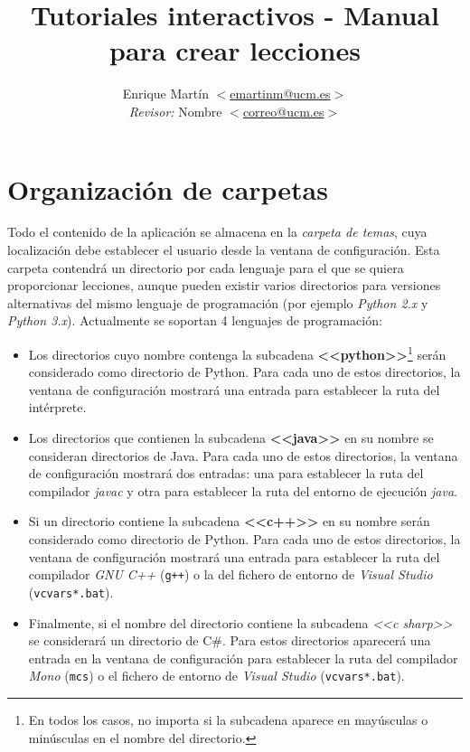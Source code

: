 \documentclass[]{article}
\title{Tutoriales interactivos - Manual para crear lecciones}
\author{Enrique Martín $<$\url{emartinm@ucm.es}$>$ \\ \emph{Revisor:} Nombre $<$\url{correo@ucm.es}$>$\\}
\newcommand{\code}[1]{{\lstinline[basicstyle=\sffamily,mathescape]!#1!}}
\begin{document}
\maketitle

\section{Organización de carpetas}
Todo el contenido de la aplicación se almacena en la \emph{carpeta de temas}, cuya localización debe establecer el usuario desde la ventana de configuración. Esta carpeta contendrá un directorio por cada lenguaje para el que se quiera proporcionar lecciones, aunque pueden existir varios directorios para versiones alternativas del mismo lenguaje de programación (por ejemplo \emph{Python 2.x} y \emph{Python 3.x}). Actualmente se soportan 4 lenguajes de programación:

\begin{itemize}
  \item[\textbf{Python}] Los directorios cuyo nombre contenga la subcadena \textbf{<<python>>}\footnote{En todos los casos, no importa si la subcadena aparece en mayúsculas o minúsculas en el nombre del directorio.} serán considerado como directorio de Python. Para cada uno de estos directorios, la ventana de configuración mostrará una entrada para establecer la ruta del intérprete.
  \item[\textbf{Java}] Los directorios que contienen la subcadena \textbf{<<java>>} en su nombre se consideran directorios de Java. Para cada uno de estos directorios, la ventana de configuración mostrará dos entradas: una para establecer la ruta del compilador \emph{javac} y otra para establecer la ruta del entorno de ejecución \emph{java}.
  \item[\textbf{C++}] Si un directorio contiene la subcadena \textbf{<<c++>>} en su nombre serán considerado como directorio de Python. Para cada uno de estos directorios, la ventana de configuración mostrará una entrada para establecer la ruta del compilador \emph{GNU C++} (\code{g++}) o la del fichero de entorno de \emph{Visual Studio} (\code{vcvars*.bat}). 
  \item[\textbf{C\#}] Finalmente, si el nombre del directorio contiene la subcadena \emph{<<c sharp>>} se considerará un directorio de C\#. Para estos directorios aparecerá una entrada en la ventana de configuración para establecer la ruta del compilador \emph{Mono} (\code{mcs}) o el fichero de entorno de \emph{Visual Studio} (\code{vcvars*.bat}).
\end{itemize}
\end{document}
